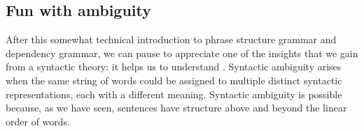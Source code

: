 











\subsection{Fun with ambiguity}

After this somewhat technical introduction to phrase structure grammar and dependency grammar, we can pause to appreciate one of the insights that we gain from a syntactic theory: it helps us to understand .  Syntactic ambiguity arises when the same string of words could be assigned to multiple distinct syntactic representations, each with a different meaning.  Syntactic ambiguity is possible because, as we have seen, sentences have structure above and beyond the linear order of words. 


